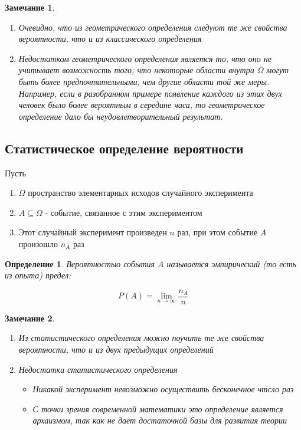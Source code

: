 \documentclass[a4paper, 14pt]{report}
\newtheorem{defenition}{Определение}[section]
\newtheorem{note}{Замечание}[section]
\begin{document}
\begin{note}
    \begin{enumerate}
        \item Очевидно, что из геометрического определения следуют те же свойства вероятности, что и из классического определения
        \item Недостатком геометрического определения является то, что оно не учитывает возможность того, что некоторые области внутри $\Omega$ могут быть более предпочтительными, чем другие области той же меры. Например, если в разобранном примере появление каждого из этих двух человек было более вероятным в середине часа, то геометрическое определение дало бы неудовлетворительный результат.
    \end{enumerate}
\end{note}

\subsection{Статистическое определение вероятности}

Пусть 

\begin{enumerate}
    \item $\Omega$ пространство элементарных исходов случайного эксперимента
    \item $A \subseteq \Omega$ - событие, связанное с этим экспериментом
    \item Этот случайный эксперимент произведен $n$ раз, при этом событие $A$ произошло $n_A$ раз
\end{enumerate}

\begin{defenition}
    Вероятностью события $A$ называется эмпирический (то есть из опыта) предел:

    $$
    P(A) = \lim_{n \to \infty} \frac{n_A}{n}
    $$
\end{defenition}

\begin{note}
    \begin{enumerate}
        \item Из статистического определения можно поучить те же свойства вероятности, что и из двух предыдущих определений
        \item Недостатки статистического определения

            \begin{itemize}
                \item Никакой эксперимент невозможно осуществить бесконечное чтсло раз
                \item С точки зрения современной математики это определение является архаизмом, так как не дает достаточной базы для развития теории
            \end{itemize}
    \end{enumerate}
\end{note}
\end{document}
